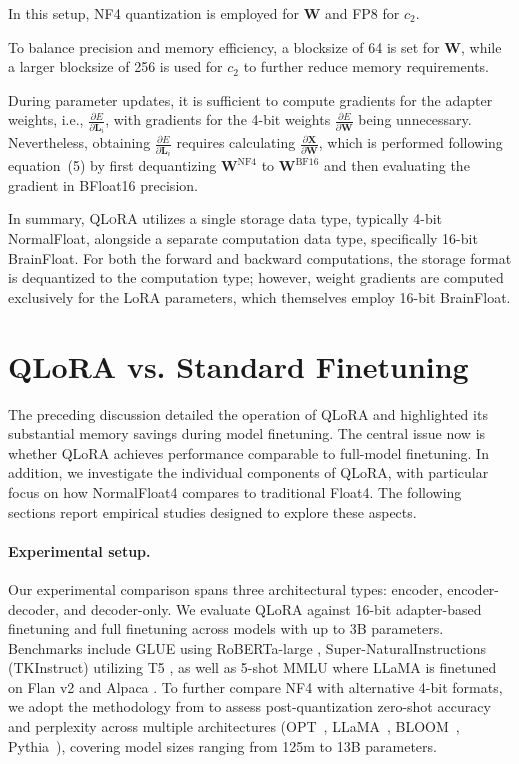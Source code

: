 In this setup, NF4 quantization is employed for $\mathbf{W}$ and FP8 for $c_2$.

To balance precision and memory efficiency, a blocksize of 64 is set for $\mathbf{W}$, while a larger blocksize of 256 is used for $c_2$ to further reduce memory requirements.

During parameter updates, it is sufficient to compute gradients for the adapter weights, i.e., $\frac{\partial E}{\partial \mathbf{L}_i}$, with gradients for the 4-bit weights $\frac{\partial E}{\partial \mathbf{W}}$ being unnecessary. Nevertheless, obtaining $\frac{\partial E}{\partial \mathbf{L}_i}$ requires calculating $\frac{\partial \mathbf{X}}{\partial \mathbf{W}}$, which is performed following equation~(5) by first dequantizing $\mathbf{W}^{\text{NF4}}$ to $\mathbf{W}^{\text{BF16}}$ and then evaluating the gradient in BFloat16 precision.

In summary, \textsc{QLoRA} utilizes a single storage data type, typically 4-bit NormalFloat, alongside a separate computation data type, specifically 16-bit BrainFloat. For both the forward and backward computations, the storage format is dequantized to the computation type; however, weight gradients are computed exclusively for the LoRA parameters, which themselves employ 16-bit BrainFloat.

\section{QLoRA vs. Standard Finetuning}
\label{sec:comp_to_std}

The preceding discussion detailed the operation of QLoRA and highlighted its substantial memory savings during model finetuning. The central issue now is whether QLoRA achieves performance comparable to full-model finetuning. In addition, we investigate the individual components of QLoRA, with particular focus on how NormalFloat4 compares to traditional Float4. The following sections report empirical studies designed to explore these aspects.

\paragraph{Experimental setup.} Our experimental comparison spans three architectural types: encoder, encoder-decoder, and decoder-only. We evaluate QLoRA against 16-bit adapter-based finetuning and full finetuning across models with up to 3B parameters. Benchmarks include GLUE \citep{wang2018glue} using RoBERTa-large \citep{liu2019roberta}, Super-NaturalInstructions (TKInstruct) \citep{wang2022super} utilizing T5 \citep{t5}, as well as 5-shot MMLU \citep{hendrycksmeasuring} where LLaMA is finetuned on Flan v2 \citep{longpre2023flan} and Alpaca \citep{alpaca}. To further compare NF4 with alternative 4-bit formats, we adopt the methodology from \citet{dettmers2022case} to assess post-quantization zero-shot accuracy and perplexity across multiple architectures (OPT~\citep{zhang2022opt}, LLaMA~\citep{touvron2023llama}, BLOOM~\citep{scao2022bloom}, Pythia~\citep{biderman2023pythia}), covering model sizes ranging from 125m to 13B parameters.

